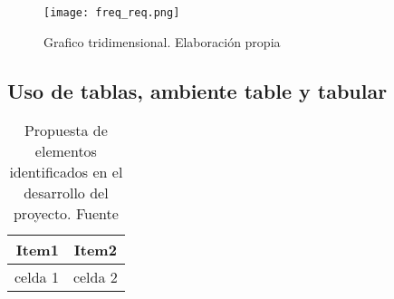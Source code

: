 \begin{figure}
\centering
\texttt{[image: freq\_req.png]}
\caption{Grafico tridimensional. Elaboración propia}
\label{fig:figure1}
\end{figure}

\begin{figure*}[htb]
\centering
{}

\label{fig:examples}
\end{figure*}

 \subsection*{Uso de tablas, ambiente table y tabular}
 \begin{table}[htb]
     \centering
     \begin{tabular}{rc} 
	\toprule
    	Item1 & Item2  \\ %
	\midrule
	celda 1 & celda 2\\
	\bottomrule

\end{tabular}
     \caption{Propuesta de elementos identificados en el desarrollo del proyecto. Fuente \citep{Hinton2012}}
     \label{tab:my_label}
 \end{table}

